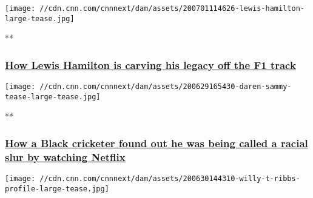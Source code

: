 \href{/videos/sports/2020/07/01/lewis-hamilton-legacy-off-the-track-equality-racism-formula-one-spt-intl.cnn/video/playlists/international-sport-playlist-general-videos/}{}

\texttt{[image: //cdn.cnn.com/cnnnext/dam/assets/200701114626-lewis-hamilton-large-tease.jpg]}

**

\hypertarget{how-lewis-hamilton-is-carving-his-legacy-off-the-f1-track}{%
\subsubsection{\texorpdfstring{\href{/videos/sports/2020/07/01/lewis-hamilton-legacy-off-the-track-equality-racism-formula-one-spt-intl.cnn/video/playlists/international-sport-playlist-general-videos/}{How
Lewis Hamilton is carving his legacy off the F1
track}}{How Lewis Hamilton is carving his legacy off the F1 track}}\label{how-lewis-hamilton-is-carving-his-legacy-off-the-f1-track}}

\href{/videos/sports/2020/07/03/daren-sammy-racism-cricket-west-indies-indian-premier-league-spt-intl-lon-orig-cmd.cnn/video/playlists/international-sport-playlist-general-videos/}{}

\texttt{[image: //cdn.cnn.com/cnnnext/dam/assets/200629165430-daren-sammy-tease-large-tease.jpg]}

**

\hypertarget{how-a-black-cricketer-found-out-he-was-being-called-a-racial-slur-by-watching-netflix}{%
\subsubsection{\texorpdfstring{\href{/videos/sports/2020/07/03/daren-sammy-racism-cricket-west-indies-indian-premier-league-spt-intl-lon-orig-cmd.cnn/video/playlists/international-sport-playlist-general-videos/}{How
a Black cricketer found out he was being called a racial slur by
watching
Netflix}}{How a Black cricketer found out he was being called a racial slur by watching Netflix}}\label{how-a-black-cricketer-found-out-he-was-being-called-a-racial-slur-by-watching-netflix}}

\href{/videos/sports/2020/06/30/willy-t-ribbs-black-motorsport-pioneer-formula-one-nascar-indy500-spt-intl-lon-orig-cmd.cnn/video/playlists/international-sport-playlist-general-videos/}{}

\texttt{[image: //cdn.cnn.com/cnnnext/dam/assets/200630144310-willy-t-ribbs-profile-large-tease.jpg]}

